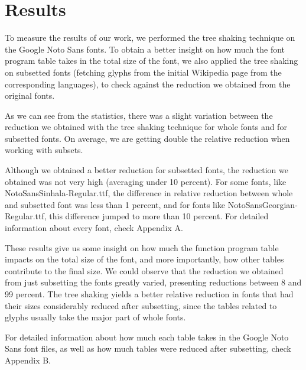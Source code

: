 \documentclass[12pt]{article}
\begin{document}
\section{Results}

To measure the results of our work, we performed the tree shaking
technique on the Google Noto Sans fonts\cite{notosans}. To obtain a
better insight on how much the font program table takes in the total
size of the font, we also applied the tree shaking on  subsetted fonts
(fetching glyphs from the initial Wikipedia page from the corresponding
languages), to check against the reduction we obtained from the original
fonts.



As we can see from the statistics, there was a slight variation between
the reduction we obtained with the tree shaking technique for whole
fonts and for subsetted fonts. On average, we are getting double the
relative reduction when working with subsets. 

Although we obtained a better reduction for subsetted fonts, the
reduction we obtained was not very high (averaging under 10 percent). For
some fonts, like NotoSansSinhala-Regular.ttf, the difference in relative
reduction between whole and subsetted font was less than 1 percent, and
for fonts like NotoSansGeorgian-Regular.ttf, this difference jumped to
more than 10 percent. For detailed information about every font, check
Appendix A.

These results give us some insight on how much the function program
table impacts on the total size of the font, and more importantly, how
other tables contribute to the final size. We could observe that the
reduction we obtained from just subsetting the fonts greatly
varied, presenting reductions between 8 and 99 percent. The tree shaking
yields a better relative reduction in fonts that had their sizes
considerably reduced after subsetting, since the tables related to
glyphs usually take the major part of whole fonts.

For detailed information about how much each table takes in the Google
Noto Sans font files, as well as how much tables were reduced after
subsetting, check Appendix B.
\end{document}
